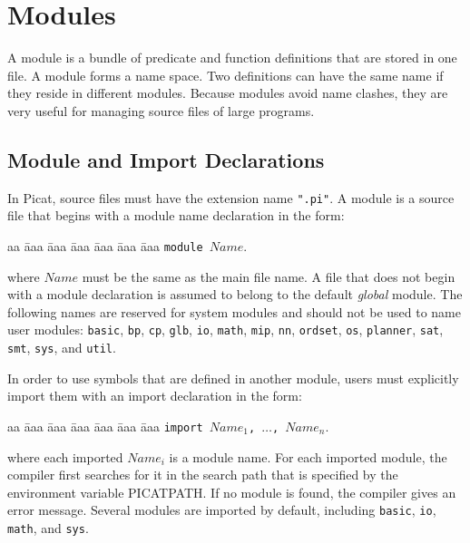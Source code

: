 \chapter{Modules}
A module is a bundle of predicate and function definitions that are stored in one file. A module forms a name space.  Two definitions can have the same name if they reside in different modules. Because modules avoid name clashes, they are very useful for managing source files of large programs.

\section{Module and Import Declarations}
In Picat, source files must have the extension name \texttt{".pi"}.  A module is a source file that begins with a module name declaration in the form:
\begin{tabbing}
aa \= aaa \= aaa \= aaa \= aaa \= aaa \= aaa \kill
\> \texttt{module $Name$}.
\end{tabbing}
where $Name$ must be the same as the main file name. A file that does not begin with a module declaration is assumed to belong to the default \emph{global} module. The following names are reserved for system modules and should not be used to name user modules: \texttt{basic}, \texttt{bp}, \texttt{cp}, \texttt{glb},  \texttt{io}, \texttt{math}, \texttt{mip}, \texttt{nn}, \texttt{ordset}, \texttt{os}, \texttt{planner}, \texttt{sat}, \texttt{smt}, \texttt{sys},  and \texttt{util}.

In order to use symbols that are defined in another module, users must explicitly import them with an import declaration in the form:
\begin{tabbing}
aa \= aaa \= aaa \= aaa \= aaa \= aaa \= aaa \kill
\> \texttt{import $Name_1$, $\ldots$, $Name_n$}.
\end{tabbing}
where each imported $Name_i$ is a module name. For each imported module, the compiler first searches for it in the search path that is specified by the environment variable PICATPATH. If no module is found, the compiler gives an error message. Several modules are imported by default, including  \texttt{basic}, \texttt{io}, \texttt{math},  and \texttt{sys}.

